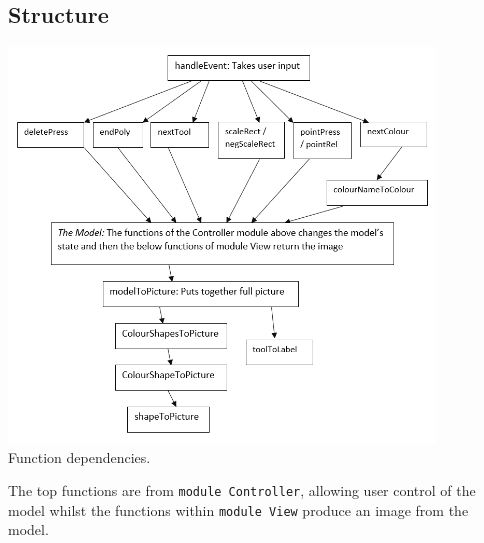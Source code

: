 \documentclass[11pt]{article}
\begin{document}
\subsection{Structure}
\begin{center}
\includegraphics[width=0.85\textwidth]{program.png}\\
Function dependencies.
\end{center}
The top functions are from \verb|module Controller|, allowing user control of the model whilst the functions within  \verb|module View| produce an image from the model.
\end{document}
